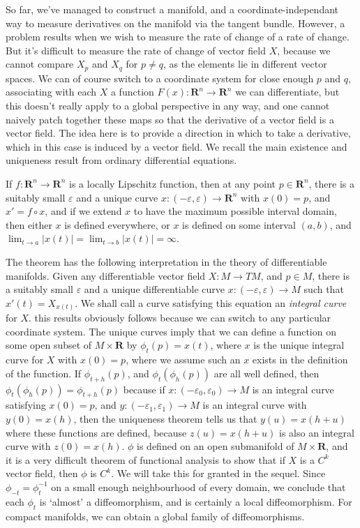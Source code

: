 So far, we've managed to construct a manifold, and a coordinate-independant way to measure derivatives on the manifold via the tangent bundle. However, a problem results when we wish to measure the rate of change of a rate of change. But it's difficult to measure the rate of change of vector field $X$, because we cannot compare $X_p$ and $X_q$ for $p \neq q$, as the elements lie in different vector spaces. We can of course switch to a coordinate system for close enough $p$ and $q$, associating with each $X$ a function $F(x) : \mathbf{R}^n \to \mathbf{R}^n$ we can differentiate, but this doesn't really apply to a global perspective in any way, and one cannot naively patch together these maps so that the derivative of a vector field is a vector field. The idea here is to provide a direction in which to take a derivative, which in this case is induced by a vector field. We recall the main existence and uniqueness result from ordinary differential equations.

\begin{theorem}
    If $f: \mathbf{R}^n \to \mathbf{R}^n$ is a locally Lipschitz function, then at any point $p \in \mathbf{R}^n$, there is a suitably small $\varepsilon$ and a unique curve $x: (-\varepsilon, \varepsilon) \to \mathbf{R}^n$ with $x(0) = p$, and $x' = f \circ x$, and if we extend $x$ to have the maximum possible interval domain, then either $x$ is defined everywhere, or $x$ is defined on some interval $(a,b)$, and $\lim_{t \to a} |x(t)| = \lim_{t \to b} |x(t)| = \infty$.
\end{theorem}

The theorem has the following interpretation in the theory of differentiable manifolds. Given any differentiable vector field $X: M \to TM$, and $p \in M$, there is a suitably small $\varepsilon$ and a unique differentiable curve $x: (-\varepsilon,\varepsilon) \to M$ such that $x'(t) = X_{x(t)}$. We shall call a curve satisfying this equation an \emph{integral curve} for $X$. this results obviously follows because we can switch to any particular coordinate system. The unique curves imply that we can define a function on some open subset of $M \times \mathbf{R}$ by $\phi_t(p) = x(t)$, where $x$ is the unique integral curve for $X$ with $x(0) = p$, where we assume such an $x$ exists in the definition of the function. If $\phi_{t+h}(p)$, and $\phi_t(\phi_h(p))$ are all well defined, then $\phi_t(\phi_h(p)) = \phi_{t + h}(p)$ because if $x: (-\varepsilon_0,\varepsilon_0) \to M$ is an integral curve satisfying $x(0) = p$, and $y: (-\varepsilon_1, \varepsilon_1) \to M$ is an integral curve with $y(0) = x(h)$, then the uniqueness theorem tells us that $y(u) = x(h + u)$ where these functions are defined, because $z(u) = x(h + u)$ is also an integral curve with $z(0) = x(h)$. $\phi$ is defined on an open submanifold of $M \times \mathbf{R}$, and it is a very difficult theorem of functional analysis to show that if $X$ is a $C^k$ vector field, then $\phi$ is $C^k$. We will take this for granted in the sequel. Since $\phi_{-t} = \phi_t^{-1}$ on a small enough neighbourhood of every domain, we conclude that each $\phi_t$ is `almost' a diffeomorphism, and is certainly a local diffeomorphism. For compact manifolds, we can obtain a global family of diffeomorphisms.

